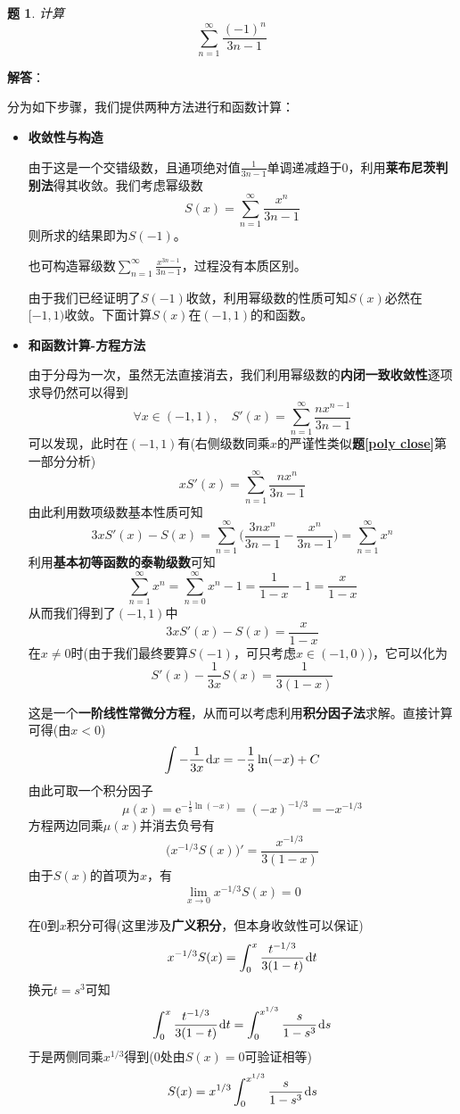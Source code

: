 \documentclass[a4paper,UTF8,fontset=windows,AutoFakeBold]{ctexart}
\newcommand*{\dr}{\hspace{0.07em}\mathrm{d}}
\newcommand*{\er}{\mathrm{e}}
\newcommand*{\suminf}[1][n=1]{\sum_{#1}^\infty}
\newcommand*{\note}{\noindent *}
\theoremstyle{ex}
\newtheorem{exercise}{题}
\newcommand{\exref}[1]{\textbf{题\;\ref{#1}\;}}
\newcommand{\sol}[1]{{\vspace{5pt}\kaishu\noindent\textbf{解答}：\vspace{-3pt}
\begin{compactitem}
    \item[] #1
\end{compactitem}
}}
\begin{document}
\begin{framed}
\begin{exercise}
    计算
    $$\suminf\frac{(-1)^n}{3n-1}$$
\end{exercise}
\sol{
    分为如下步骤，我们提供两种方法进行和函数计算：
    \begin{itemize}
        \item \textbf{收敛性与构造}
        
        由于这是一个交错级数，且通项绝对值$\frac{1}{3n-1}$单调递减趋于0，利用\textbf{莱布尼茨判别法}得其收敛。我们考虑幂级数
        $$S(x)=\suminf\frac{x^n}{3n-1}$$
        则所求的结果即为$S(-1)$。

        \note 也可构造幂级数$\suminf\frac{x^{3n-1}}{3n-1}$，过程没有本质区别。

        由于我们已经证明了$S(-1)$收敛，利用幂级数的性质可知$S(x)$必然在$[-1,1)$收敛。下面计算$S(x)$在$(-1,1)$的和函数。
        
        \item \textbf{和函数计算-方程方法}
        
        由于分母为一次，虽然无法直接消去，我们利用幂级数的\textbf{内闭一致收敛性}逐项求导仍然可以得到
        $$\forall x\in(-1,1),\quad S'(x)=\suminf\frac{nx^{n-1}}{3n-1}$$
        可以发现，此时在$(-1,1)$有(右侧级数同乘$x$的严谨性类似\exref{poly close}第一部分分析)
        $$xS'(x)=\suminf\frac{nx^n}{3n-1}$$
        由此利用数项级数基本性质可知
        $$3xS'(x)-S(x)=\suminf\bigg(\frac{3nx^n}{3n-1}-\frac{x^n}{3n-1}\bigg)=\suminf x^n$$
        利用\textbf{基本初等函数的泰勒级数}可知
        $$\suminf x^n=\suminf[n=0]x^n-1=\frac{1}{1-x}-1=\frac{x}{1-x}$$
        从而我们得到了$(-1,1)$中
        $$3xS'(x)-S(x)=\frac{x}{1-x}$$
        在$x\ne0$时(由于我们最终要算$S(-1)$，可只考虑$x\in(-1,0)$)，它可以化为
        $$S'(x)-\frac{1}{3x}S(x)=\frac{1}{3(1-x)}$$

        这是一个\textbf{一阶线性常微分方程}，从而可以考虑利用\textbf{积分因子法}求解。直接计算可得(由$x<0$)
        $$\int-\frac{1}{3x}\dr x=-\frac{1}{3}\ln(-x)+C$$
        由此可取一个积分因子
        $$\mu(x)=\er^{-\frac{1}{3}\ln(-x)}=(-x)^{-1/3}=-x^{-1/3}$$
        方程两边同乘$\mu(x)$并消去负号有
        $$\big(x^{-1/3}S(x)\big)'=\frac{x^{-1/3}}{3(1-x)}$$
        由于$S(x)$的首项为$x$，有
        $$\lim_{x\to0}x^{-1/3}S(x)=0$$

        在0到$x$积分可得(这里涉及\textbf{广义积分}，但本身收敛性可以保证)
        $$x^{-1/3}S(x)=\int_0^x\frac{t^{-1/3}}{3(1-t)}\dr t$$
        换元$t=s^3$可知
        $$\int_0^x\frac{t^{-1/3}}{3(1-t)}\dr t=\int_0^{x^{1/3}}\frac{s}{1-s^3}\dr s$$
        于是两侧同乘$x^{1/3}$得到(0处由$S(x)=0$可验证相等)
        $$S(x)=x^{1/3}\int_0^{x^{1/3}}\frac{s}{1-s^3}\dr s$$


\end{itemize}}
\end{framed}
\end{document}
